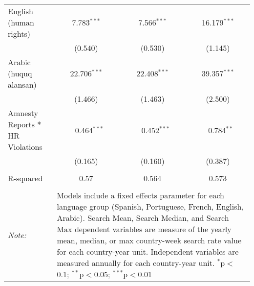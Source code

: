 \begin{table}[!htbp]
\begin{tabular}{@{\extracolsep{5pt}}lccc}
  English (human rights) & 7.783$^{***}$ & 7.566$^{***}$ & 16.179$^{***}$ \\ 
  & (0.540) & (0.530) & (1.145) \\ 
  Arabic (huquq alansan) & 22.706$^{***}$ & 22.408$^{***}$ & 39.357$^{***}$ \\ 
  & (1.466) & (1.463) & (2.500) \\ 
  Amnesty Reports * HR Violations & $-$0.464$^{***}$ & $-$0.452$^{***}$ & $-$0.784$^{**}$ \\ 
  & (0.165) & (0.160) & (0.387) \\ 
 \hline \\[-1.8ex] 
R-squared  & 0.57 & 0.564 & 0.573 \\ 
\hline 
\hline \\[-1.8ex] 
\textit{Note:}  & \multicolumn{3}{l}{\parbox[t]{8cm}{Models include a fixed effects parameter for each language group (Spanish, Portuguese, French, English, Arabic). Search Mean, Search Median, and Search Max dependent variables are measure of the yearly mean, median, or max country-week search rate value for each country-year unit. Independent variables are measured annually for each country-year unit. $^{*}$p$<$0.1; $^{**}$p$<$0.05; $^{***}$p$<$0.01}} \\ 
\end{tabular} 
\end{table} 
